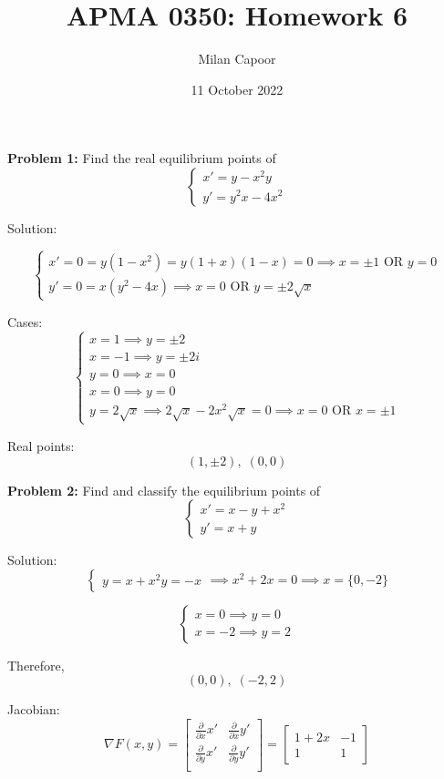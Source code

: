 \documentclass[12pt]{article}
\title{APMA 0350: Homework 6}
\author{Milan Capoor}
\date{11 October 2022}
\begin{document}
\maketitle

\textbf{Problem 1:} Find the real equilibrium points of 
\[\begin{cases}
    x' = y - x^2 y\\
    y' = y^2 x - 4x^2
\end{cases}\]

Solution:

\[\begin{cases}
    x' = 0 = y(1 - x^2) = y(1 + x)(1 - x) = 0 \implies x = \pm 1 \text{ OR } y = 0\\
    y' = 0 = x (y^2 - 4x) \implies x = 0 \text{ OR } y = \pm 2\sqrt{x}
\end{cases}\]

Cases:
\[\begin{cases}
    x = 1 \implies y = \pm 2\\
    x = -1 \implies y = \pm 2i\\
    y = 0 \implies x = 0\\
    x = 0 \implies y = 0\\
    y = 2\sqrt{x} \implies 2\sqrt{x} - 2x^2 \sqrt{x} = 0 \implies x = 0 \text{ OR } x = \pm 1
\end{cases}\]

Real points:
\[\boxed{(1, \pm 2), \; (0, 0)}\]

\pagebreak 

\textbf{Problem 2:} Find and classify the equilibrium points of 
\[\begin{cases}
    x' = x - y + x^2\\
    y' = x + y
\end{cases}\]

Solution:
\[\begin{cases}
    y = x + x^2
    y = -x
\end{cases} \implies x^2 + 2x = 0 \implies x = \{0, -2\}\]

\[\begin{cases}
    x = 0 \implies y = 0\\
    x = -2 \implies y = 2
\end{cases}\]

Therefore,
\[(0, 0), \; (-2, 2)\]

Jacobian:
\[\nabla F(x, y) = \begin{bmatrix}
    \frac{\partial}{\partial x} x' & \frac{\partial}{\partial x} y'\\
    \frac{\partial}{\partial y} x' & \frac{\partial}{\partial y} y'\\
\end{bmatrix} = \begin{bmatrix}
    1 + 2x & -1\\
    1 & 1
\end{bmatrix}\]
\end{document}
